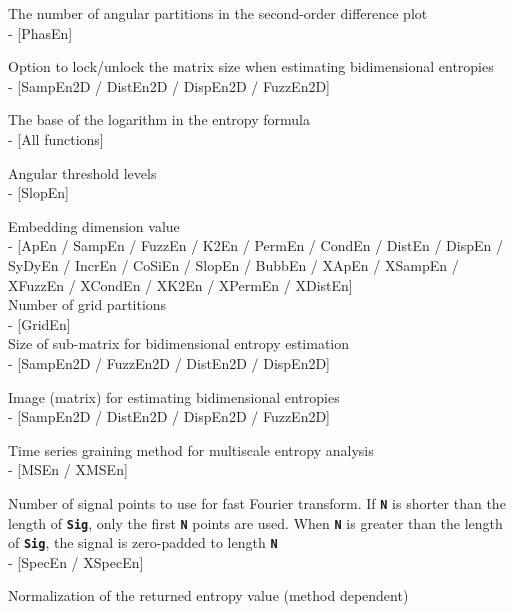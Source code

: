 \documentclass[12pt, a4paper, titlepage, openany]{book}
\begin{document}
\begin{description}[labelsep=1cm, labelwidth=2cm, nosep, style=multiline,leftmargin=3cm]
\item[\texttt{K}]		 The number of angular partitions in the second-order difference plot \\ - [PhasEn]\\
\item[\texttt{Lock}]		 Option to lock/unlock the matrix size when estimating bidimensional entropies \\ - [SampEn2D / DistEn2D / DispEn2D / FuzzEn2D]\\
\item[\texttt{Logx}]		 The base of the logarithm in the entropy formula  \\ - [All functions]\\
\item[\texttt{Lvls}]		 Angular threshold levels \\ - [SlopEn]\\
\item[\texttt{m}]		 Embedding dimension value \\ - [ApEn / SampEn / FuzzEn / K2En / PermEn / CondEn / DistEn / DispEn / SyDyEn / IncrEn / CoSiEn / SlopEn / BubbEn / XApEn / XSampEn / XFuzzEn / XCondEn / XK2En / XPermEn / XDistEn] \\
Number of grid partitions \\ - [GridEn]\\
Size of sub-matrix for bidimensional entropy estimation \\ - [SampEn2D / FuzzEn2D / DistEn2D / DispEn2D]\\
\item[\texttt{Mat}]		Image (matrix) for estimating bidimensional entropies \\ - [SampEn2D / DistEn2D / DispEn2D / FuzzEn2D]\\
\item[\texttt{Methodx}]		Time series graining method for multiscale entropy analysis \\ - [MSEn / XMSEn]\\
\item[\texttt{N}]		Number of signal points to use for fast Fourier transform. If \texttt{\textbf{N}} is shorter than the length of \texttt{\textbf{Sig}}, only the first \texttt{\textbf{N}} points are used. When \texttt{\textbf{N}} is greater than the length of \texttt{\textbf{Sig}}, the signal is zero-padded to length \texttt{\textbf{N}} \\ - [SpecEn / XSpecEn]\\
\item[\texttt{Norm}]		Normalization of the returned entropy value (method dependent) \\

\end{description}
\end{document}
